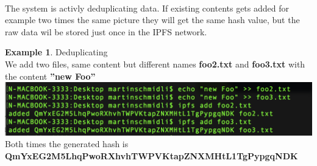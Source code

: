 \documentclass[a4paper,11pt, oneside]{report}
\theoremstyle{definition}
\newtheorem{exmp}{Example}[subsection]
\begin{document}
\noindent \\[0.3cm]
The system is activly deduplicating data. If existing contents gets added for example two times the same picture they will get the same hash value, but the raw data wil be stored just once in the IPFS network.
\begin{exmp}Deduplicating\\[0.3cm]
	We add two files, same content but different names \textbf{foo2.txt} and \textbf{foo3.txt} with the content \textbf{''new Foo''}\\[0.3cm]
	\includegraphics[width=\textwidth]{img/addFile06.png}\\[0.3cm]
	Both times the generated hash is \\ \textbf{QmYxEG2M5LhqPwoRXhvhTWPVKtapZNXMHtL1TgPypgqNDK}
\end{exmp}

\newpage
\end{document}
